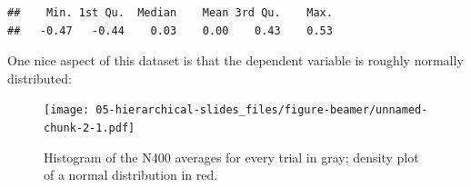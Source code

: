 \documentclass[12pt,ignorenonframetext,aspectratio=169]{beamer}
\newenvironment{Shaded}{\begin{snugshade}}{\end{snugshade}}
\newcommand{\DataTypeTok}[1]{\textcolor[rgb]{0.13,0.29,0.53}{#1}}
\newcommand{\DecValTok}[1]{\textcolor[rgb]{0.00,0.00,0.81}{#1}}
\newcommand{\KeywordTok}[1]{\textcolor[rgb]{0.13,0.29,0.53}{\textbf{#1}}}
\newcommand{\NormalTok}[1]{#1}
\newcommand{\OperatorTok}[1]{\textcolor[rgb]{0.81,0.36,0.00}{\textbf{#1}}}
\newcommand{\StringTok}[1]{\textcolor[rgb]{0.31,0.60,0.02}{#1}}
\begin{document}
\begin{frame}[fragile]

\scriptsize

\begin{Shaded}
\end{Shaded}

\begin{verbatim}
##    Min. 1st Qu.  Median    Mean 3rd Qu.    Max. 
##   -0.47   -0.44    0.03    0.00    0.43    0.53
\end{verbatim}

\normalsize

\end{frame}

\begin{frame}

One nice aspect of this dataset is that the dependent variable is roughly normally distributed:

\small

\begin{figure}
\centering
\texttt{[image: 05-hierarchical-slides\_files/figure-beamer/unnamed-chunk-2-1.pdf]}
\caption{\label{fig:unnamed-chunk-2}Histogram of the N400 averages for every trial in gray; density plot of a normal distribution in red.}
\end{figure}

\normalsize

\end{frame}
\end{document}
